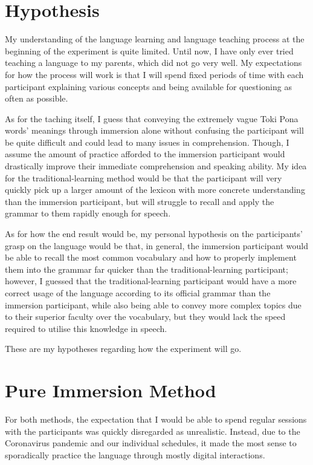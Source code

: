 \documentclass[a4paper,10pt]{article}
\begin{document}
\section{Hypothesis}
My understanding of the language learning and language teaching process at the beginning of the
experiment is quite limited. Until now, I have only ever tried teaching a language to my
parents, which did not go very well. My expectations for how the process will work is that
I will spend fixed periods of time with each participant explaining various concepts and being
available for questioning as often as possible.

As for the taching itself, I guess that conveying the extremely vague Toki Pona words' meanings
through immersion alone without confusing the participant will be quite difficult and could lead to
many issues in comprehension. Though, I assume the amount of practice afforded to the immersion
participant would drastically improve their immediate comprehension and speaking ability. My idea
for the traditional-learning method would be that the participant will very quickly pick up a
larger amount of the lexicon with more concrete understanding than the immersion participant, but
will struggle to recall and apply the grammar to them rapidly enough for speech.

As for how the end result would be, my personal hypothesis on the participants' grasp on the language
would be that, in general, the immersion participant would be able to recall the most common vocabulary
and how to properly implement them into the grammar far quicker than the traditional-learning
participant; however, I guessed that the traditional-learning participant would have a more correct
usage of the language according to its official grammar than the immersion participant, while also
being able to convey more complex topics due to their superior faculty over the vocabulary, but they
would lack the speed required to utilise this knowledge in speech.

These are my hypotheses regarding how the experiment will go.


\section{Pure Immersion Method}
For both methods, the expectation that I would be able to spend regular sessions with the participants
was quickly disregarded as unrealistic. Instead, due to the Coronavirus pandemic and our individual
schedules, it made the most sense to sporadically practice the language through mostly digital
interactions.
\end{document}
